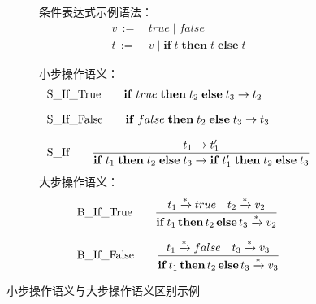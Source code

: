 \begin{figure}[htbp]
    \vspace{13pt}
    \centering
    \begin{subfigure}[b]{0.8\textwidth}
        条件表达式示例语法：
        \begin{align*}
        v\, := &\,  true\; |\; false \\
        t\, := & \, v\; |\; \mathbf{if}\; t\; \mathbf{then}\; t\; \mathbf{else}\; t
        \end{align*}
    \end{subfigure}
    \vfill
    \begin{subfigure}[b]{0.8\textwidth}
        小步操作语义：
    \begin{equation}
        \setlength{\jot}{10pt}
        \nonumber
            \begin{aligned}
            & \text{S\_If\_True} \qquad \mathbf{if}\; true\; \mathbf{then}\; t_2\; \mathbf{else}\; t_3\rightarrow t_2 \\
            &  \text{S\_If\_False} \qquad \mathbf{if}\; false\; \mathbf{then}\; t_2\; \mathbf{else}\; t_3\rightarrow t_3 \\
            & \text{S\_If} \qquad \displaystyle{\frac{t_1\rightarrow t'_1}{\mathbf{if}\; t_1\; \mathbf{then}\; t_2\; \mathbf{else}\; t_3\rightarrow \mathbf{if}\; t'_1\; \mathbf{then}\; t_2\; \mathbf{else}\; t_3 }}
        \end{aligned}
    \end{equation}
      大步操作语义：
        \begin{equation}
            \setlength{\jot}{10pt}
            \nonumber
            \begin{aligned}
                & \text{B\_If\_True} \qquad \displaystyle{\frac{t_1\xrightarrow{*} true\quad t_2\xrightarrow{*} v_2}{\mathbf{if}\, t_1\, \mathbf{then}\, t_2\, \mathbf{else}\, t_3\xrightarrow{*} v_2 }} \\       
                & \text{B\_If\_False} \qquad \displaystyle{\frac{t_1\xrightarrow{*} false\quad t_3\xrightarrow{*} v_3}{\mathbf{if}\, t_1\, \mathbf{then}\, t_2\, \mathbf{else}\, t_3\xrightarrow{*} v_3 }}
            \end{aligned}
        \end{equation}
    \end{subfigure}
    \vspace{5pt}
    \caption{小步操作语义与大步操作语义区别示例}\label{fig:bigsmall}
\end{figure}


